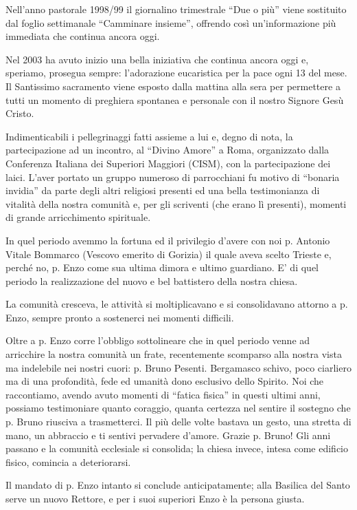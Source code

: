 Nell'anno pastorale 1998/99 il giornalino trimestrale ``Due o più'' viene sostituito dal foglio 
settimanale ``Camminare insieme'', offrendo così un'informazione più immediata che continua ancora 
oggi.

Nel 2003 ha avuto inizio una bella iniziativa che continua ancora oggi e, speriamo, prosegua 
sempre: l’adorazione eucaristica per la pace ogni 13 del mese. Il Santissimo sacramento viene 
esposto dalla mattina alla sera per permettere a tutti un momento di preghiera spontanea e personale 
con il nostro Signore Gesù Cristo.  

Indimenticabili i pellegrinaggi fatti assieme a lui e, degno di nota, la partecipazione ad un incontro, 
al ``Divino Amore'' a Roma, organizzato dalla Conferenza Italiana dei Superiori Maggiori (CISM), 
con la partecipazione dei laici. L’aver portato un gruppo numeroso di parrocchiani fu motivo di 
“bonaria invidia” da parte degli altri religiosi presenti ed una bella testimonianza di vitalità della 
nostra comunità e, per gli scriventi (che erano lì presenti), momenti di grande arricchimento 
spirituale.

In quel periodo avemmo la fortuna ed il privilegio d’avere con noi p. Antonio Vitale Bommarco 
(Vescovo emerito di Gorizia) il quale aveva scelto Trieste e, perché no, p. Enzo come sua ultima 
dimora e ultimo guardiano. E’ di quel periodo la realizzazione del nuovo e bel battistero della nostra 
chiesa.

La comunità cresceva, le attività si moltiplicavano e si consolidavano attorno a p. Enzo, sempre 
pronto a sostenerci nei momenti difficili.

Oltre a p. Enzo corre l’obbligo sottolineare che in quel periodo venne ad arricchire la nostra 
comunità un frate, recentemente scomparso alla nostra vista ma indelebile nei nostri cuori: p. Bruno 
Pesenti. Bergamasco schivo, poco ciarliero ma di una profondità, fede ed umanità dono esclusivo 
dello Spirito. Noi che raccontiamo, avendo avuto momenti di “fatica fisica” in questi ultimi anni, 
possiamo testimoniare quanto coraggio, quanta certezza nel sentire il sostegno che p. Bruno riusciva 
a trasmetterci. Il più delle volte bastava un gesto, una stretta di mano, un abbraccio e ti sentivi 
pervadere d’amore. Grazie p. Bruno! 
Gli anni passano e la comunità ecclesiale si consolida; la chiesa invece, intesa come edificio fisico, 
comincia a deteriorarsi.

Il mandato di p. Enzo intanto si conclude anticipatamente; alla Basilica del Santo serve un nuovo 
Rettore, e per i suoi superiori Enzo è la persona giusta.

